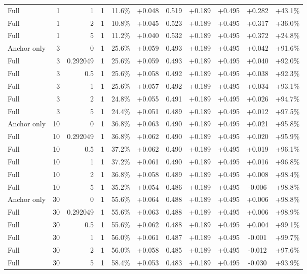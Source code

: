 \begin{table}[htbp]
\begin{tabular}{lrrrccccccc}
Full & 1 & 1 & 1 & 11.6\% & +0.048 & 0.519 & +0.189 & +0.495 & +0.282 & +43.1\% \\
Full & 1 & 2 & 1 & 10.8\% & +0.045 & 0.523 & +0.189 & +0.495 & +0.317 & +36.0\% \\
Full & 1 & 5 & 1 & 11.2\% & +0.040 & 0.532 & +0.189 & +0.495 & +0.372 & +24.8\% \\
Anchor only & 3 & 0 & 1 & 25.6\% & +0.059 & 0.493 & +0.189 & +0.495 & +0.042 & +91.6\% \\
Full & 3 & 0.292049 & 1 & 25.6\% & +0.059 & 0.493 & +0.189 & +0.495 & +0.040 & +92.0\% \\
Full & 3 & 0.5 & 1 & 25.6\% & +0.058 & 0.492 & +0.189 & +0.495 & +0.038 & +92.3\% \\
Full & 3 & 1 & 1 & 25.6\% & +0.057 & 0.492 & +0.189 & +0.495 & +0.034 & +93.1\% \\
Full & 3 & 2 & 1 & 24.8\% & +0.055 & 0.491 & +0.189 & +0.495 & +0.026 & +94.7\% \\
Full & 3 & 5 & 1 & 24.4\% & +0.051 & 0.489 & +0.189 & +0.495 & +0.012 & +97.5\% \\
Anchor only & 10 & 0 & 1 & 36.8\% & +0.063 & 0.490 & +0.189 & +0.495 & +0.021 & +95.8\% \\
Full & 10 & 0.292049 & 1 & 36.8\% & +0.062 & 0.490 & +0.189 & +0.495 & +0.020 & +95.9\% \\
Full & 10 & 0.5 & 1 & 37.2\% & +0.062 & 0.490 & +0.189 & +0.495 & +0.019 & +96.1\% \\
Full & 10 & 1 & 1 & 37.2\% & +0.061 & 0.490 & +0.189 & +0.495 & +0.016 & +96.8\% \\
Full & 10 & 2 & 1 & 36.8\% & +0.058 & 0.489 & +0.189 & +0.495 & +0.008 & +98.4\% \\
Full & 10 & 5 & 1 & 35.2\% & +0.054 & 0.486 & +0.189 & +0.495 & -0.006 & +98.8\% \\
Anchor only & 30 & 0 & 1 & 55.6\% & +0.064 & 0.488 & +0.189 & +0.495 & +0.006 & +98.8\% \\
Full & 30 & 0.292049 & 1 & 55.6\% & +0.063 & 0.488 & +0.189 & +0.495 & +0.006 & +98.9\% \\
Full & 30 & 0.5 & 1 & 55.6\% & +0.062 & 0.488 & +0.189 & +0.495 & +0.004 & +99.1\% \\
Full & 30 & 1 & 1 & 56.0\% & +0.061 & 0.487 & +0.189 & +0.495 & -0.001 & +99.7\% \\
Full & 30 & 2 & 1 & 56.0\% & +0.058 & 0.485 & +0.189 & +0.495 & -0.012 & +97.6\% \\
Full & 30 & 5 & 1 & 58.4\% & +0.053 & 0.483 & +0.189 & +0.495 & -0.030 & +93.9\% \\

\end{tabular}
\end{table}
